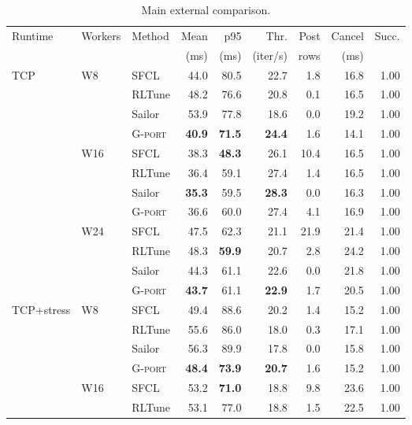 \begin{table}[t]
  \centering
  \caption{Main external comparison.}
  \label{tab:external-main}
  \begin{tabular*}{\textwidth}{@{\extracolsep{\fill}}lllrrrrrr@{}}
    \toprule
    Runtime & Workers & Method & Mean & p95 & Thr. & Post & Cancel & Succ. \\
            &         &        & (ms) & (ms) & (iter/s) & rows & (ms) & \\
    \midrule
    TCP & W8 & SFCL & 44.0 & 80.5 & 22.7 & 1.8 & 16.8 & 1.00 \\
        &    & RLTune & 48.2 & 76.6 & 20.8 & 0.1 & 16.5 & 1.00 \\
        &    & Sailor & 53.9 & 77.8 & 18.6 & 0.0 & 19.2 & 1.00 \\
        &    & \textsc{G-port} & \textbf{40.9} & \textbf{71.5} & \textbf{24.4} & 1.6 & 14.1 & 1.00 \\
    \cmidrule(l){2-9}
        & W16 & SFCL & 38.3 & \textbf{48.3} & 26.1 & 10.4 & 16.5 & 1.00 \\
        &     & RLTune & 36.4 & 59.1 & 27.4 & 1.4 & 16.5 & 1.00 \\
        &     & Sailor & \textbf{35.3} & 59.5 & \textbf{28.3} & 0.0 & 16.3 & 1.00 \\
        &     & \textsc{G-port} & 36.6 & 60.0 & 27.4 & 4.1 & 16.9 & 1.00 \\
    \cmidrule(l){2-9}
        & W24 & SFCL & 47.5 & 62.3 & 21.1 & 21.9 & 21.4 & 1.00 \\
        &     & RLTune & 48.3 & \textbf{59.9} & 20.7 & 2.8 & 24.2 & 1.00 \\
        &     & Sailor & 44.3 & 61.1 & 22.6 & 0.0 & 21.8 & 1.00 \\
        &     & \textsc{G-port} & \textbf{43.7} & 61.1 & \textbf{22.9} & 1.7 & 20.5 & 1.00 \\
    \midrule
    TCP+stress & W8 & SFCL & 49.4 & 88.6 & 20.2 & 1.4 & 15.2 & 1.00 \\
        &    & RLTune & 55.6 & 86.0 & 18.0 & 0.3 & 17.1 & 1.00 \\
        &    & Sailor & 56.3 & 89.9 & 17.8 & 0.0 & 15.8 & 1.00 \\
        &    & \textsc{G-port} & \textbf{48.4} & \textbf{73.9} & \textbf{20.7} & 1.6 & 15.2 & 1.00 \\
    \cmidrule(l){2-9}
        & W16 & SFCL & 53.2 & \textbf{71.0} & 18.8 & 9.8 & 23.6 & 1.00 \\
        &     & RLTune & 53.1 & 77.0 & 18.8 & 1.5 & 22.5 & 1.00 \\

\end{tabular*}
\end{table}
